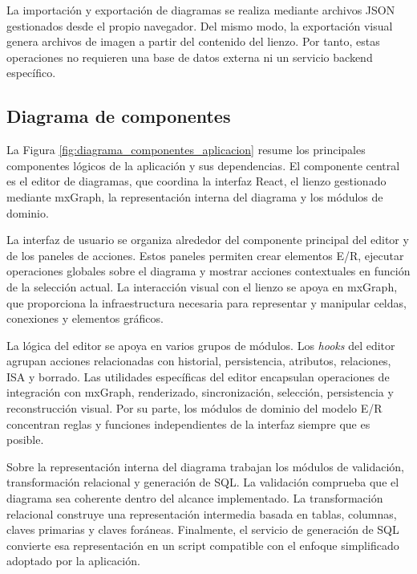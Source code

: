 La importación y exportación de diagramas se realiza mediante archivos JSON gestionados desde el propio navegador. Del mismo modo, la exportación visual genera archivos de imagen a partir del contenido del lienzo. Por tanto, estas operaciones no requieren una base de datos externa ni un servicio backend específico.

\subsection{Diagrama de componentes}

La Figura \ref{fig:diagrama_componentes_aplicacion} resume los principales componentes lógicos de la aplicación y sus dependencias. El componente central es el editor de diagramas, que coordina la interfaz React, el lienzo gestionado mediante mxGraph, la representación interna del diagrama y los módulos de dominio.


La interfaz de usuario se organiza alrededor del componente principal del editor y de los paneles de acciones. Estos paneles permiten crear elementos E/R, ejecutar operaciones globales sobre el diagrama y mostrar acciones contextuales en función de la selección actual. La interacción visual con el lienzo se apoya en mxGraph, que proporciona la infraestructura necesaria para representar y manipular celdas, conexiones y elementos gráficos.

La lógica del editor se apoya en varios grupos de módulos. Los \textit{hooks} del editor agrupan acciones relacionadas con historial, persistencia, atributos, relaciones, ISA y borrado. Las utilidades específicas del editor encapsulan operaciones de integración con mxGraph, renderizado, sincronización, selección, persistencia y reconstrucción visual. Por su parte, los módulos de dominio del modelo E/R concentran reglas y funciones independientes de la interfaz siempre que es posible.

Sobre la representación interna del diagrama trabajan los módulos de validación, transformación relacional y generación de SQL. La validación comprueba que el diagrama sea coherente dentro del alcance implementado. La transformación relacional construye una representación intermedia basada en tablas, columnas, claves primarias y claves foráneas. Finalmente, el servicio de generación de SQL convierte esa representación en un script compatible con el enfoque simplificado adoptado por la aplicación.

